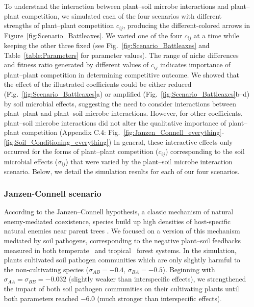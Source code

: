 To understand the interaction between plant--soil microbe interactions and plant--plant competition, we simulated each of the four scenarios with different strengths of plant--plant competition $c_{ij}$, producing the different-colored arrows in Figure~\ref{fig:Scenario_Battleaxes}.
We varied one of the four $c_{ij}$ at a time while keeping the other three fixed (see Fig.~\ref{fig:Scenario_Battleaxes} and Table~\ref{table:Parameters} for parameter values).
The range of niche differences and fitness ratio generated by different values of $c_{ij}$ indicates importance of plant--plant competition in determining competitive outcome. We showed that the effect of the illustrated coefficients could be either reduced (Fig.~\ref{fig:Scenario_Battleaxes}a) or amplified (Fig.~\ref{fig:Scenario_Battleaxes}b--d) by soil microbial effects, suggesting the need to consider interactions between plant--plant and plant--soil microbe interactions.
However, for other coefficients, plant--soil microbe interactions did not alter the qualitative importance of plant--plant competition (Appendix C.4: Fig.~\ref{fig:Janzen_Connell_everything}-\ref{fig:Soil_Conditioning_everything})
In general, these interactive effects only occurred for the forms of plant--plant competition ($c_{ij}$) corresponding to the soil microbial effects ($\sigma_{ij}$) that were varied by the plant--soil microbe interaction scenario.
Below, we detail the simulation results for each of our four scenarios.
\par



\subsubsection*{Janzen-Connell scenario}
According to the Janzen--Connell hypothesis, a classic mechanism of natural enemy-mediated coexistence, species build up high densities of host-specific natural enemies near parent trees \citep{Augspurger1984}. We focused on a version of this mechanism mediated by soil pathogens, corresponding to the negative plant--soil feedbacks measured in both temperate~\cite{Bennett2017} and tropical~\citep{Mangan2010} forest systems. In the simulation, plants cultivated soil pathogen communities which are only slightly harmful to the non-cultivating species ($\sigma_{AB} = -0.4$, $\sigma_{BA} = -0.5$). Beginning with $\sigma_{AA} = \sigma_{BB} = -0.032$ (slightly weaker than interspecific effects), we strengthened the impact of both soil pathogen communities on their cultivating plants until both parameters reached $-6.0$ (much stronger than interspecific effects).
\par


